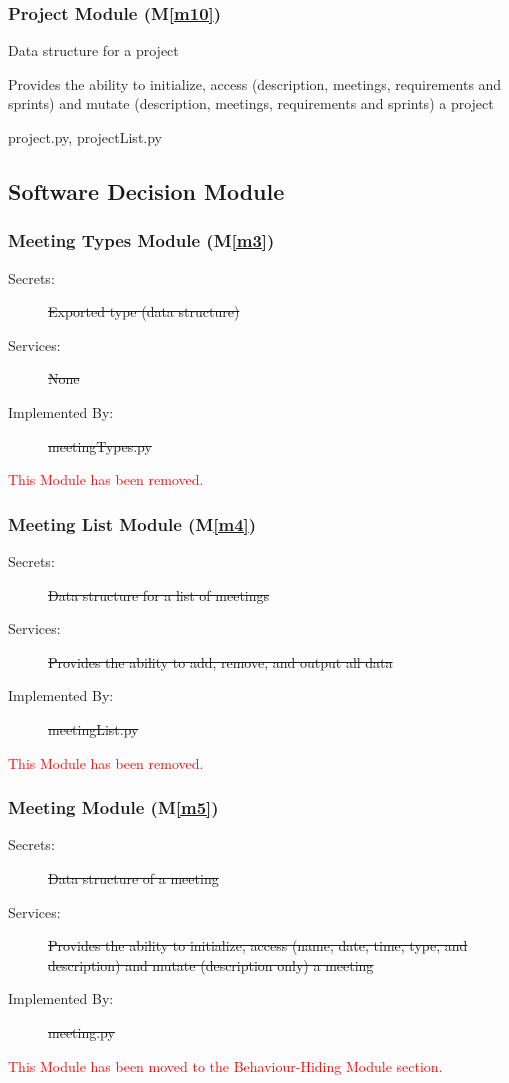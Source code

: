 \documentclass[12pt, titlepage]{article}
\newcommand{\mref}[1]{M\ref{#1}}
\begin{document}
\subsubsection{Project Module (\mref{m10})}
\begin{description}
\color{red}
    \item[Secrets:] Data structure for a project
    \item[Services:] Provides the ability to initialize, access (description, meetings, requirements and sprints) and mutate (description, meetings, requirements and sprints) a project
    \item[Implemented By:] project.py, projectList.py
\end{description}

\subsection{Software Decision Module}
\subsubsection{Meeting Types Module (\mref{m3})}
\begin{description}
    \item[Secrets:] \sout{Exported type (data structure)}
    \item[Services:] \sout{None}
    \item[Implemented By:] \sout{meetingTypes.py}
\end{description}
\textcolor{red}{This Module has been removed.}

\subsubsection{Meeting List Module (\mref{m4})}
\begin{description}
    \item[Secrets:] \sout{Data structure for a list of meetings}
    \item[Services:] \sout{Provides the ability to add, remove, and output all data}
    \item[Implemented By:] \sout{meetingList.py}
\end{description}
\textcolor{red}{This Module has been removed.}

\subsubsection{Meeting Module (\mref{m5})}
\begin{description}
    \item[Secrets:] \sout{Data structure of a meeting}
    \item[Services:] \sout{Provides the ability to initialize, access (name, date, time, type, and description) and mutate (description only) a meeting}
    \item[Implemented By:] \sout{meeting.py}
\end{description}
\textcolor{red}{This Module has been moved to the Behaviour-Hiding Module section.}
\end{document}

